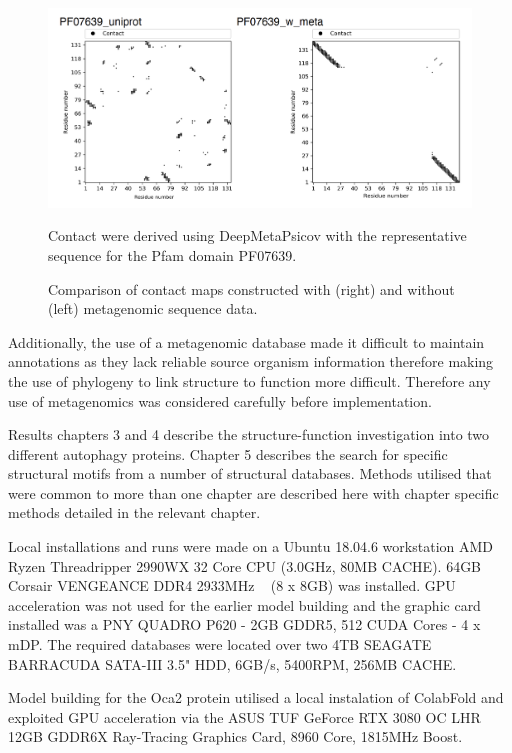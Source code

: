 \begin{figure}[th!]
    \centering
    \includegraphics[width=\textwidth]{Experimental Methods/Screenshot 2022-08-02 at 12.14.54.png}
    \caption{Comparison of contact maps constructed with (right) and without (left) metagenomic sequence data.}
    \label{fig:cmap_degrade}
    \small
    Contact were derived using DeepMetaPsicov with the representative sequence for the Pfam domain PF07639.
\end{figure}

Additionally, the use of a metagenomic database made it difficult to maintain annotations as they lack reliable source organism information therefore making the use of phylogeny to link structure to function more difficult.  Therefore any use of metagenomics was considered carefully before implementation.

Results chapters 3 and 4 describe the structure-function investigation into two different autophagy proteins.  Chapter 5 describes the search for specific structural motifs from a number of structural databases.  Methods utilised that were common to more than one chapter are described here with chapter specific methods detailed in the relevant chapter.

Local installations and runs were made on a Ubuntu 18.04.6 workstation  AMD Ryzen Threadripper 2990WX 32 Core CPU (3.0GHz, 80MB CACHE). 64GB Corsair VENGEANCE DDR4 2933MHz ~ (8 x 8GB) was installed.  GPU acceleration was not used for the earlier model building and the graphic card installed was a PNY QUADRO P620 - 2GB GDDR5, 512 CUDA Cores - 4 x mDP.  The required databases were located over two 4TB SEAGATE BARRACUDA SATA-III 3.5" HDD, 6GB/s, 5400RPM, 256MB CACHE.

Model building for the Oca2 protein utilised a local instalation of ColabFold and exploited GPU acceleration via the ASUS TUF GeForce RTX 3080 OC LHR 12GB GDDR6X Ray-Tracing Graphics Card, 8960 Core, 1815MHz Boost.

